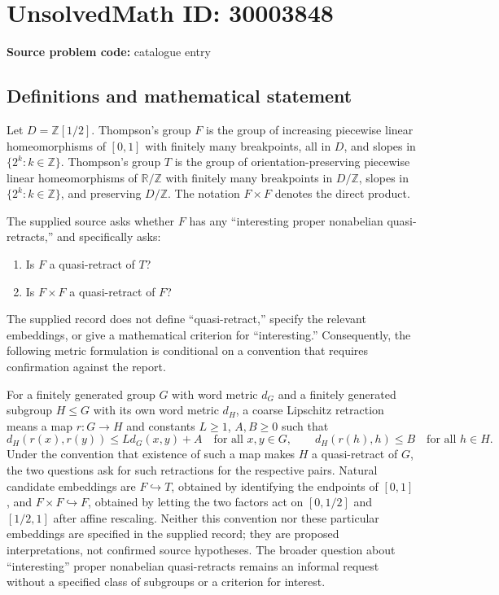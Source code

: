 \documentclass[11pt]{article}
\newcommand{\Z}{\mathbb{Z}}
\newcommand{\R}{\mathbb{R}}
\begin{document}
\section*{UnsolvedMath ID: 30003848}
\textbf{Source problem code:} catalogue entry
\subsection{Definitions and mathematical statement}
Let \(D=\Z[1/2]\). Thompson's group \(F\) is the group of increasing piecewise linear homeomorphisms of \([0,1]\) with finitely many breakpoints, all in \(D\), and slopes in \(\{2^k:k\in\Z\}\). Thompson's group \(T\) is the group of orientation-preserving piecewise linear homeomorphisms of \(\R/\Z\) with finitely many breakpoints in \(D/\Z\), slopes in \(\{2^k:k\in\Z\}\), and preserving \(D/\Z\). The notation \(F\times F\) denotes the direct product.

The supplied source asks whether \(F\) has any ``interesting proper nonabelian quasi-retracts,'' and specifically asks:
\begin{enumerate}
\item Is \(F\) a quasi-retract of \(T\)?
\item Is \(F\times F\) a quasi-retract of \(F\)?
\end{enumerate}
The supplied record does not define ``quasi-retract,'' specify the relevant embeddings, or give a mathematical criterion for ``interesting.'' Consequently, the following metric formulation is conditional on a convention that requires confirmation against the report.

For a finitely generated group \(G\) with word metric \(d_G\) and a finitely generated subgroup \(H\leq G\) with its own word metric \(d_H\), a coarse Lipschitz retraction means a map \(r:G\to H\) and constants \(L\geq1\), \(A,B\geq0\) such that
\[
 d_H(r(x),r(y))\leq Ld_G(x,y)+A
 \quad\text{for all }x,y\in G,
 \qquad
 d_H(r(h),h)\leq B
 \quad\text{for all }h\in H.
\]
Under the convention that existence of such a map makes \(H\) a quasi-retract of \(G\), the two questions ask for such retractions for the respective pairs. Natural candidate embeddings are \(F\hookrightarrow T\), obtained by identifying the endpoints of \([0,1]\), and \(F\times F\hookrightarrow F\), obtained by letting the two factors act on \([0,1/2]\) and \([1/2,1]\) after affine rescaling. Neither this convention nor these particular embeddings are specified in the supplied record; they are proposed interpretations, not confirmed source hypotheses. The broader question about ``interesting'' proper nonabelian quasi-retracts remains an informal request without a specified class of subgroups or a criterion for interest.
\end{document}

